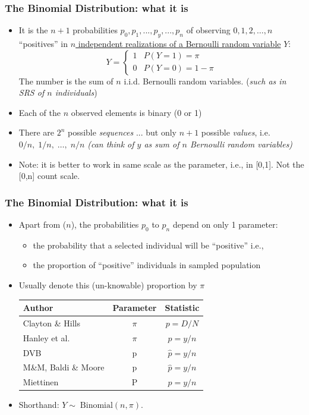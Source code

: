 \documentclass[10pt,handout]{beamer}\usepackage[]{graphicx}\usepackage[]{color}
\begin{document}
\begin{frame}
	\frametitle{The Binomial Distribution: what it is}
	\small
	\begin{itemize}
		\setlength\itemsep{0.5em}
		\item It is the $n+1$ probabilities $p_{0}, p_{1}, ..., p_{y}, ..., p_{n}$ of observing 
		$0, 1, 2, \dots , n$ ``positives''  in \underline{$n$ independent realizations of a Bernoulli random variable} $Y$:
		$$
		Y = \begin{cases}
		1 & P(Y=1) = \pi \\
		0 & P(Y=0) = 1-\pi
		\end{cases}	
		$$
		The number is the sum of $n$ i.i.d. Bernoulli random variables.	(\emph{such as in SRS of $n$ individuals}) \pause 
		\item Each of the $n$ observed elements is binary (0 or 1) %
		\item There are $2^{n}$ possible \textit{sequences} ... but only $n+1$ possible \textit{values}, 
		i.e. $0/n,\;1/n,\;\dots ,\;n/n$  \emph{(can think of $y$ as sum of $n$ Bernoulli random variables)} 
		\item Note: it is better to work in same scale as the parameter, i.e., in [0,1]. Not the [0,n] count scale.
	\end{itemize}
\end{frame}	

\begin{frame}
	\frametitle{The Binomial Distribution: what it is}
	\begin{itemize}
		\setlength\itemsep{0.5em}
		\item Apart from  ($n$), the probabilities $p_{0}$ to $p_{n}$ depend on only 1 parameter:
		\begin{itemize}
			\item the probability that a selected individual will be ``positive''  i.e.,
			\item the proportion of ``positive'' individuals in sampled population
		\end{itemize}
		
		\item Usually denote this (un-knowable) proportion by $\pi$
		
		\begin{tabular}{lcc}
			\hline
			Author & \textbf{Parameter} & \textbf{Statistic} \\
			\hline
			Clayton \& Hills   & $\pi $ & $p= D/N$ \\
			Hanley et al. & $\pi $ & $p= y/n$ \\
			DVB & p &$\hat{p} = y/n$ \\
			M\&M, Baldi \& Moore & p &$\hat{p} = y/n$ \\
			Miettinen& P & $p=y/n$ \\
			\hline
		\end{tabular}
		\item
		Shorthand:  $Y\sim\; \textrm{Binomial}(n, \pi)$.
	\end{itemize}
\end{frame}
\end{document}

